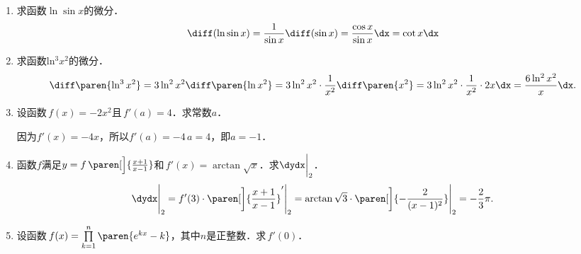 \begin{enumerate}
\item 求函数\(\ln\sin x\)的微分．
  \ifshowsol
  \begin{equation*}
    \diff(\ln\sin x)
    = \frac1{\sin x} \diff(\sin x)
    = \frac{\cos x}{\sin x} \dx
    = \cot x \dx
  \end{equation*}
  \fi

\item 求函数\(\operatorname{ln^3} x^2\)的微分．
  \ifshowsol
  \begin{equation*}
    \diff\paren{\operatorname{ln^3} x^2}
    = 3\operatorname{ln^2} x^2 \diff\paren{\ln x^2}
    = 3\operatorname{ln^2} x^2 \cdot \frac1{x^2} \diff\paren{x^2}
    = 3\operatorname{ln^2} x^2 \cdot \frac1{x^2} \cdot 2x \dx
    = \frac{6 \operatorname{ln^2} x^2}{x} \dx.
  \end{equation*}
  \fi

\item 设函数\(\,f(x) = -2x^2\)且\(\,f'(a) = 4\)．求常数\(a\)．

  \ifshowsol
  因为\(f'(x) = -4x\)，所以\(f'(a) = -4\,a = 4\)，即\(a = -1\)．
  \fi

\item 函数\(f\)满足\(y = f\,\paren[\Big]{\frac{x+1}{x-1}} \)和\(\,f'(x) = \arctan\sqrt x\)．求\(\dydx\bigg\vert_{2}\)．
  \ifshowsol
  \begin{equation*}
    \dydx\Bigg\vert_{2}
    = f'(3) \cdot \paren[\bigg]{\frac{x+1}{x-1}}'\Bigg\vert_{2}
    = \arctan\sqrt3 \cdot \paren[\bigg]{-\frac{2}{(x-1)^2}} \Bigg\vert_{2}
    = - \frac23 \pi.
  \end{equation*}
  \fi

\item 设函数\(\,f(x) = \prod\limits_{k=1}^n \paren{e^{kx}-k}\)，其中\(n\)是正整数．求\(\,f'(0)\)．


\end{enumerate}
